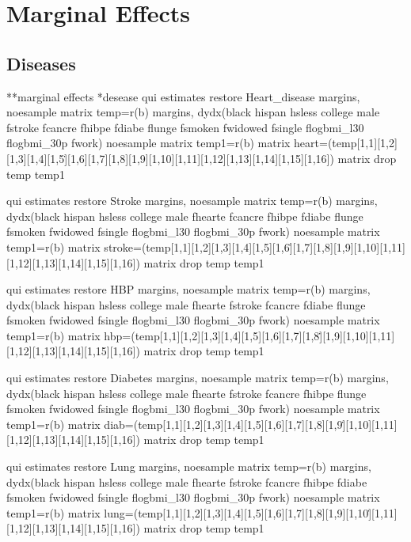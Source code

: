 \documentclass{article}
\begin{document}
\pagebreak
\section*{\centering Marginal Effects}
\subsection*{\centering Diseases}
\begin{Statacode}
**marginal effects
*desease
qui estimates restore Heart_disease
margins, noesample
matrix temp=r(b)
margins, dydx(black hispan hsless college male fstroke fcancre fhibpe fdiabe flunge fsmoken fwidowed fsingle flogbmi_l30 flogbmi_30p fwork) noesample
matrix temp1=r(b)
matrix heart=(temp[1,1][1,2][1,3][1,4][1,5]\.[1,6][1,7][1,8][1,9][1,10][1,11][1,12][1,13][1,14][1,15][1,16])
matrix drop temp temp1

qui estimates restore Stroke
margins, noesample
matrix temp=r(b)
margins, dydx(black hispan hsless college male fhearte fcancre fhibpe fdiabe flunge fsmoken fwidowed fsingle flogbmi_l30 flogbmi_30p fwork) noesample
matrix temp1=r(b)
matrix stroke=(temp[1,1][1,2][1,3][1,4][1,5][1,6]\.[1,7][1,8][1,9][1,10][1,11][1,12][1,13][1,14][1,15][1,16])
matrix drop temp temp1

qui estimates restore HBP
margins, noesample
matrix temp=r(b)
margins, dydx(black hispan hsless college male fhearte fstroke fcancre fdiabe flunge fsmoken fwidowed fsingle flogbmi_l30 flogbmi_30p fwork) noesample
matrix temp1=r(b)
matrix hbp=(temp[1,1][1,2][1,3][1,4][1,5][1,6][1,7][1,8]\.[1,9][1,10][1,11][1,12][1,13][1,14][1,15][1,16])
matrix drop temp temp1

qui estimates restore Diabetes
margins, noesample
matrix temp=r(b)
margins, dydx(black hispan hsless college male fhearte fstroke fcancre fhibpe flunge fsmoken fwidowed fsingle flogbmi_l30 flogbmi_30p fwork) noesample
matrix temp1=r(b)
matrix diab=(temp[1,1][1,2][1,3][1,4][1,5][1,6][1,7][1,8][1,9]\.[1,10][1,11][1,12][1,13][1,14][1,15][1,16])
matrix drop temp temp1

qui estimates restore Lung
margins, noesample
matrix temp=r(b)
margins, dydx(black hispan hsless college male fhearte fstroke fcancre fhibpe fdiabe fsmoken fwidowed fsingle flogbmi_l30 flogbmi_30p fwork) noesample
matrix temp1=r(b)
matrix lung=(temp[1,1][1,2][1,3][1,4][1,5][1,6][1,7][1,8][1,9][1,10]\.[1,11][1,12][1,13][1,14][1,15][1,16])
matrix drop temp temp1


\end{Statacode}
\end{document}
